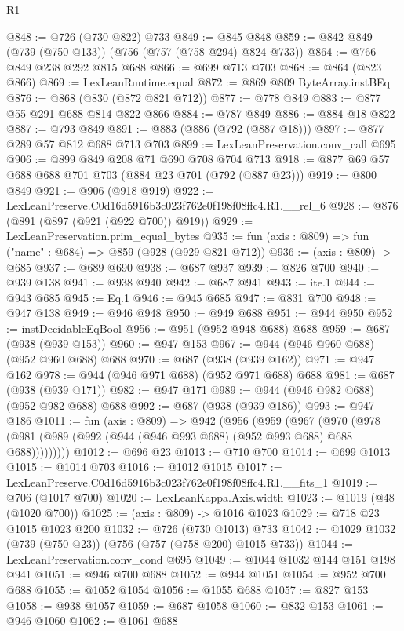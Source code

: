 \begin{lexlean}{R1}
\begin{coremodule}
@848 := @726 (@730 @822) @733
@849 := @845 @848
@859 := @842 @849 (@739 (@750 @133)) (@756 (@757 (@758 @294) @824 @733))
@864 := @766 @849 @238 @292 @815 @688
@866 := @699 @713 @703
@868 := @864 (@823 @866)
@869 := LexLeanRuntime.equal
@872 := @869 @809 ByteArray.instBEq
@876 := @868 (@830 (@872 @821 @712))
@877 := @778 @849
@883 := @877 @55 @291 @688 @814 @822 @866
@884 := @787 @849
@886 := @884 @18 @822
@887 := @793 @849
@891 := @883 (@886 (@792 (@887 @18)))
@897 := @877 @289 @57 @812 @688 @713 @703
@899 := LexLeanPreservation.conv_call @695
@906 := @899 @849 @208 @71 @690 @708 @704 @713
@918 := @877 @69 @57 @688 @688 @701 @703 (@884 @23 @701 (@792 (@887 @23)))
@919 := @800 @849
@921 := @906 (@918 @919)
@922 := LexLeanPreserve.C0d16d5916b3c023f762e0f198f08ffc4.R1.__rel_6
@928 := @876 (@891 (@897 (@921 (@922 @700)) @919))
@929 := LexLeanPreservation.prim_equal_bytes
@935 := fun (axis : @809) => fun ("name" : @684) => @859 (@928 (@929 @821 @712))
@936 := (axis : @809) -> @685
@937 := @689 @690
@938 := @687 @937
@939 := @826 @700
@940 := @939 @138
@941 := @938 @940
@942 := @687 @941
@943 := ite.{1}
@944 := @943 @685
@945 := Eq.{1}
@946 := @945 @685
@947 := @831 @700
@948 := @947 @138
@949 := @946 @948
@950 := @949 @688
@951 := @944 @950
@952 := instDecidableEqBool
@956 := @951 (@952 @948 @688) @688
@959 := @687 (@938 (@939 @153))
@960 := @947 @153
@967 := @944 (@946 @960 @688) (@952 @960 @688) @688
@970 := @687 (@938 (@939 @162))
@971 := @947 @162
@978 := @944 (@946 @971 @688) (@952 @971 @688) @688
@981 := @687 (@938 (@939 @171))
@982 := @947 @171
@989 := @944 (@946 @982 @688) (@952 @982 @688) @688
@992 := @687 (@938 (@939 @186))
@993 := @947 @186
@1011 := fun (axis : @809) =>
  @942
    (@956
      (@959
        (@967
          (@970 (@978 (@981 (@989 (@992 (@944 (@946 @993 @688) (@952 @993 @688) @688 @688)))))))))
@1012 := @696 @23
@1013 := @710 @700
@1014 := @699 @1013
@1015 := @1014 @703
@1016 := @1012 @1015
@1017 := LexLeanPreserve.C0d16d5916b3c023f762e0f198f08ffc4.R1.__fits_1
@1019 := @706 (@1017 @700)
@1020 := LexLeanKappa.Axis.width
@1023 := @1019 (@48 (@1020 @700))
@1025 := (axis : @809) -> @1016 @1023
@1029 := @718 @23 @1015 @1023 @200
@1032 := @726 (@730 @1013) @733
@1042 := @1029 @1032 (@739 (@750 @23)) (@756 (@757 (@758 @200) @1015 @733))
@1044 := LexLeanPreservation.conv_cond @695
@1049 := @1044 @1032 @144 @151 @198 @941
@1051 := @946 @700 @688
@1052 := @944 @1051
@1054 := @952 @700 @688
@1055 := @1052 @1054
@1056 := @1055 @688
@1057 := @827 @153
@1058 := @938 @1057
@1059 := @687 @1058
@1060 := @832 @153
@1061 := @946 @1060
@1062 := @1061 @688

\end{coremodule}
\end{lexlean}
